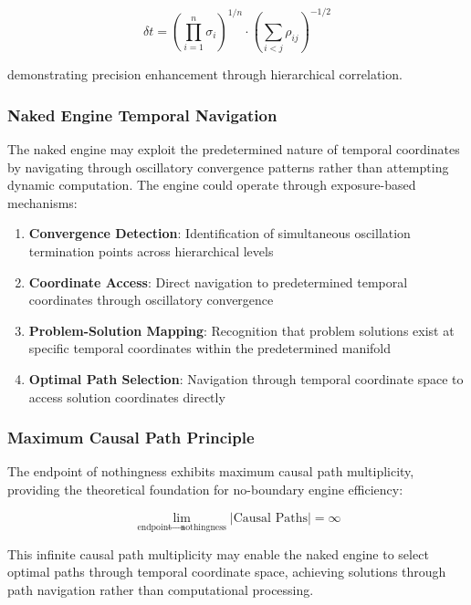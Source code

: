 \documentclass[11pt,a4paper]{article}
\theoremstyle{remark}
\begin{document}
\begin{equation}
\delta t = \left(\prod_{i=1}^{n} \sigma_i\right)^{1/n} \cdot \left(\sum_{i<j} \rho_{ij}\right)^{-1/2}
\end{equation}

demonstrating precision enhancement through hierarchical correlation.

\subsubsection{Naked Engine Temporal Navigation}

The naked engine may exploit the predetermined nature of temporal coordinates by navigating through oscillatory convergence patterns rather than attempting dynamic computation. The engine could operate through exposure-based mechanisms:

\begin{enumerate}
\item \textbf{Convergence Detection}: Identification of simultaneous oscillation termination points across hierarchical levels
\item \textbf{Coordinate Access}: Direct navigation to predetermined temporal coordinates through oscillatory convergence
\item \textbf{Problem-Solution Mapping}: Recognition that problem solutions exist at specific temporal coordinates within the predetermined manifold
\item \textbf{Optimal Path Selection}: Navigation through temporal coordinate space to access solution coordinates directly
\end{enumerate}

\subsubsection{Maximum Causal Path Principle}

The endpoint of nothingness exhibits maximum causal path multiplicity, providing the theoretical foundation for no-boundary engine efficiency:

\begin{equation}
\lim_{\text{endpoint} \to \text{nothingness}} |\text{Causal Paths}| = \infty
\end{equation}

This infinite causal path multiplicity may enable the naked engine to select optimal paths through temporal coordinate space, achieving solutions through path navigation rather than computational processing.
\end{document}
